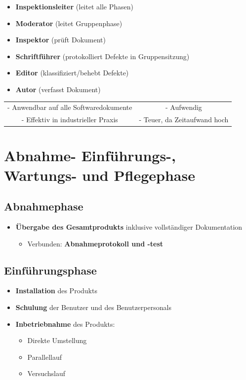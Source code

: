 \documentclass[parskip=full, 12pt]{scrartcl}
\begin{document}
\begin{itemize}
				\begin{itemize}
					\item \textbf{Inspektionsleiter} (leitet alle Phasen)
					\item \textbf{Moderator} (leitet Gruppenphase)
					\item \textbf{Inspektor} (prüft Dokument)
					\item \textbf{Schriftführer} (protokolliert Defekte in Gruppensitzung)
					\item \textbf{Editor} (klassifiziert/behebt Defekte)
					\item \textbf{Autor} (verfasst Dokument)
				\end{itemize}
			\end{itemize}
	
			\begin{center}
				\begin{tabular}{c|c}
				\color{green}{\textbf{+}} & \color{red}{\textbf{-}} \\
				\hline
				- Anwendbar auf alle Softwaredokumente & - Aufwendig \\
				- Effektiv in industrieller Praxis & - Teuer, da Zeitaufwand hoch \\
				\end{tabular}
			\end{center}
	
	\newpage
	\section{Abnahme- Einführungs-, Wartungs- und Pflegephase}
	
		\subsection{Abnahmephase}
			\begin{itemize}
				\item \textbf{Übergabe des Gesamtprodukts} inklusive vollständiger Dokumentation
				\begin{itemize}
					\item Verbunden: \textbf{Abnahmeprotokoll und -test}
				\end{itemize}
			\end{itemize}
		
		\subsection{Einführungsphase}

			\begin{itemize}
				\item \textbf{Installation} des Produkts
				\item \textbf{Schulung} der Benutzer und des Benutzerpersonals
				\item \textbf{Inbetriebnahme} des Produkts:
				\begin{itemize}
					\item Direkte Umstellung
					\item Parallellauf
					\item Versuchslauf
				\end{itemize}
			\end{itemize}
		
\end{document}
